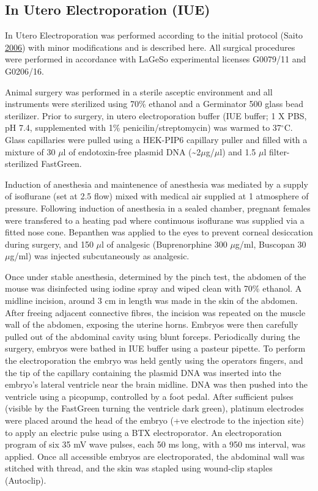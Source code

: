 \documentclass[onehalf,12pt]{beavtex}
\begin{document}
  \subsection{In Utero Electroporation (IUE)}\label{IUEmethod}
  
  In Utero Electroporation was performed according to the initial protocol
  (Saito
  \protect\hyperlink{ref-Saitovivoelectroporationembryonic2006a}{2006})
  with minor modifications and is described here. All surgical procedures
  were performed in accordance with LaGeSo experimental licenses G0079/11
  and G0206/16.
  
  Animal surgery was performed in a sterile asceptic environment and all
  instruments were sterilized using 70\% ethanol and a Germinator 500
  glass bead sterilizer. Prior to surgery, in utero electroporation buffer
  (IUE buffer; 1 X PBS, pH 7.4, supplemented with 1\%
  penicilin/streptomycin) was warmed to 37\(^\circ\)C. Glass capillaries
  were pulled using a HEK-PIP6 capillary puller and filled with a mixture
  of 30 \(\mu\)l of endotoxin-free plasmid DNA
  (\textasciitilde{}2\(\mu\)g/\(\mu\)l) and 1.5 \(\mu\)l filter-sterilized
  FastGreen.
  
  Induction of anesthesia and maintenence of anesthesia was mediated by a
  supply of isoflurane (set at 2.5 flow) mixed with medical air supplied
  at 1 atmosphere of pressure. Following induction of anesthesia in a
  sealed chamber, pregnant females were transfered to a heating pad where
  continuous isoflurane was supplied via a fitted nose cone. Bepanthen was
  applied to the eyes to prevent corneal desiccation during surgery, and
  150 \(\mu\)l of analgesic (Buprenorphine 300 \(\mu\)g/ml, Buscopan 30
  \(\mu\)g/ml) was injected subcutaneously as analgesic.
  
  Once under stable anesthesia, determined by the pinch test, the abdomen
  of the mouse was disinfected using iodine spray and wiped clean with
  70\% ethanol. A midline incision, around 3 cm in length was made in the
  skin of the abdomen. After freeing adjacent connective fibres, the
  incision was repeated on the muscle wall of the abdomen, exposing the
  uterine horns. Embryos were then carefully pulled out of the abdominal
  cavity using blunt forceps. Periodically during the surgery, embryos
  were bathed in IUE buffer using a pasteur pipette. To perform the
  electroporation the embryo was held gently using the operators fingers,
  and the tip of the capillary containing the plasmid DNA was inserted
  into the embryo's lateral ventricle near the brain midline. DNA was then
  pushed into the ventricle using a picopump, controlled by a foot pedal.
  After sufficient pulses (visible by the FastGreen turning the ventricle
  dark green), platinum electrodes were placed around the head of the
  embryo (+ve electrode to the injection site) to apply an electric pulse
  using a BTX electroporator. An electroporation program of six 35 mV wave
  pulses, each 50 ms long, with a 950 ms interval, was applied. Once all
  accessible embryos are electroporated, the abdominal wall was stitched
  with thread, and the skin was stapled using wound-clip staples
  (Autoclip).
  
\end{document}
